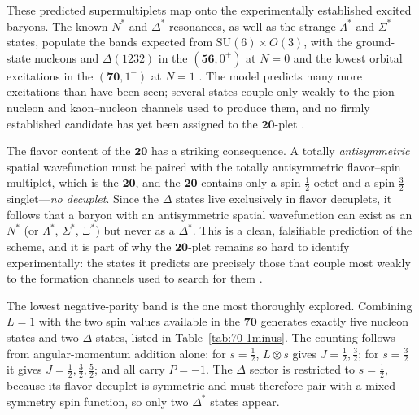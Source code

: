 These predicted supermultiplets map onto the experimentally established excited baryons.
The known $N^{*}$ and $\Delta^{*}$ resonances, as well as the strange $\Lambda^{*}$ and
$\Sigma^{*}$ states, populate the bands expected from $\mathrm{SU}(6)\times O(3)$, with the
ground-state nucleons and $\Delta(1232)$ in the $(\mathbf{56},0^{+})$ at $N=0$ and the
lowest orbital excitations in the $(\mathbf{70},1^{-})$ at $N=1$
\cite[Ch.~15]{Amsler2018}. The model predicts many more excitations than have been seen;
several states couple only weakly to the pion--nucleon and kaon--nucleon channels used to
produce them, and no firmly established candidate has yet been assigned to the
$\mathbf{20}$-plet \cite[Ch.~15]{Amsler2018}.

The flavor content of the $\mathbf{20}$ has a striking consequence. A totally
\emph{antisymmetric} spatial wavefunction must be paired with the totally antisymmetric
flavor--spin multiplet, which is the $\mathbf{20}$, and the $\mathbf{20}$ contains only a
spin-$\tfrac12$ octet and a spin-$\tfrac32$ singlet---\emph{no decuplet}. Since the
$\Delta$ states live exclusively in flavor decuplets, it follows that a baryon with an
antisymmetric spatial wavefunction can exist as an $N^{*}$ (or $\Lambda^{*}$,
$\Sigma^{*}$, $\Xi^{*}$) but never as a $\Delta^{*}$. This is a clean, falsifiable
prediction of the scheme, and it is part of why the $\mathbf{20}$-plet remains so hard to
identify experimentally: the states it predicts are precisely those that couple most
weakly to the formation channels used to search for them \cite[Ch.~15]{Amsler2018}.

The lowest negative-parity band is the one most thoroughly explored. Combining $L=1$ with
the two spin values available in the $\mathbf{70}$ generates exactly five nucleon states
and two $\Delta$ states, listed in Table~\ref{tab:70-1minus}. The counting follows from
angular-momentum addition alone: for $s=\tfrac12$, $L\otimes s$ gives $J=\tfrac12,
\tfrac32$; for $s=\tfrac32$ it gives $J=\tfrac12,\tfrac32,\tfrac52$; and all carry
$P=-1$. The $\Delta$ sector is restricted to $s=\tfrac12$, because its flavor decuplet is
symmetric and must therefore pair with a mixed-symmetry spin function, so only two
$\Delta^{*}$ states appear.

